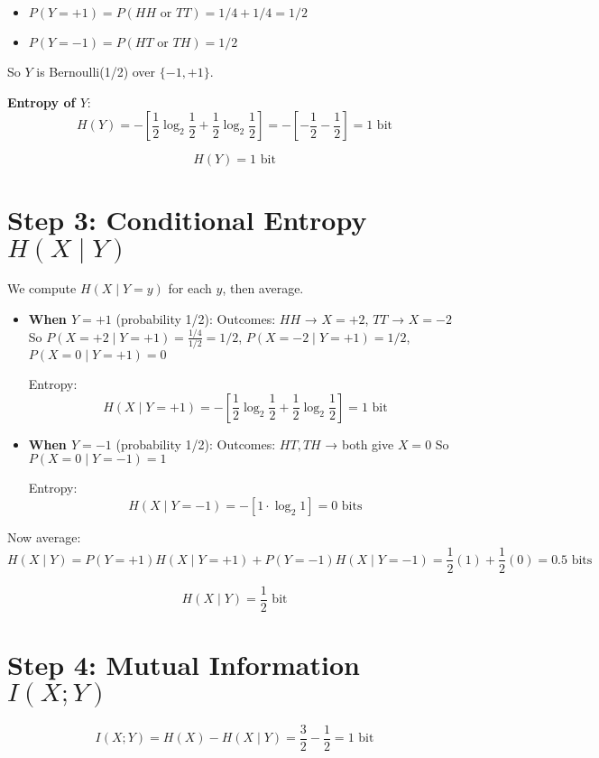 \documentclass{article}
\begin{document}
\begin{itemize}
\item \(P(Y = +1) = P(HH \text{ or } TT) = 1/4 + 1/4 = 1/2\)
    \item \(P(Y = -1) = P(HT \text{ or } TH) = 1/2\)
\end{itemize}

So \(Y\) is Bernoulli(1/2) over \(\{-1, +1\}\).

\textbf{Entropy of \(Y\)}:
\[
H(Y) = -\left[ \frac{1}{2} \log_2 \frac{1}{2} + \frac{1}{2} \log_2 \frac{1}{2} \right] = -\left[ -\frac{1}{2} - \frac{1}{2} \right] = 1 \text{ bit}
\]

\[
\boxed{H(Y) = 1 \text{ bit}}
\]

\section*{Step 3: Conditional Entropy \(H(X \mid Y)\)}

We compute \(H(X \mid Y = y)\) for each \(y\), then average.

\begin{itemize}
\item \textbf{When \(Y = +1\)} (probability 1/2):  
    Outcomes: \(HH\) → \(X = +2\), \(TT\) → \(X = -2\)  
    So \(P(X = +2 \mid Y = +1) = \frac{1/4}{1/2} = 1/2\),  
    \(P(X = -2 \mid Y = +1) = 1/2\),  
    \(P(X = 0 \mid Y = +1) = 0\)

    Entropy:
    \[
    H(X \mid Y = +1) = -\left[ \frac{1}{2} \log_2 \frac{1}{2} + \frac{1}{2} \log_2 \frac{1}{2} \right] = 1 \text{ bit}
    \]

    \item \textbf{When \(Y = -1\)} (probability 1/2):  
    Outcomes: \(HT, TH\) → both give \(X = 0\)  
    So \(P(X = 0 \mid Y = -1) = 1\)

    Entropy:
    \[
    H(X \mid Y = -1) = -[1 \cdot \log_2 1] = 0 \text{ bits}
    \]
\end{itemize}
Now average:
\[
H(X \mid Y) = P(Y = +1) H(X \mid Y = +1) + P(Y = -1) H(X \mid Y = -1) = \frac{1}{2}(1) + \frac{1}{2}(0) = 0.5 \text{ bits}
\]

\[
\boxed{H(X \mid Y) = \frac{1}{2} \text{ bit}}
\]

\section*{Step 4: Mutual Information \(I(X; Y)\)}

\[
I(X; Y) = H(X) - H(X \mid Y) = \frac{3}{2} - \frac{1}{2} = 1 \text{ bit}
\]
\end{document}
